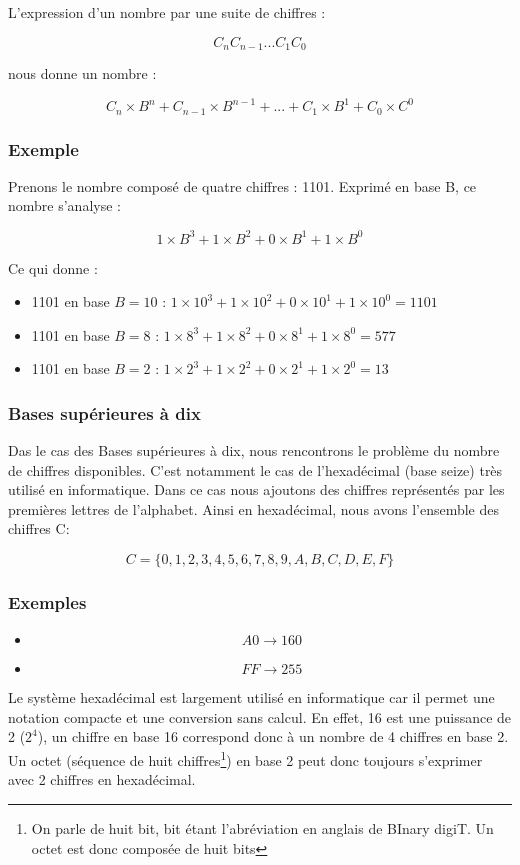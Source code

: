 \documentclass[a4paper,11pt]{book}
\theoremstyle{definition}
\begin{document}
L'expression d'un nombre par une suite de chiffres :

\[C_n C_{n-1} ... C_1 C_0\]

nous donne un nombre : 

\[C_n \times B^n + C_{n-1} \times B^{n-1} + ... + C_1 \times B^1 + C_0 \times C^0\]

\subsubsection{Exemple}

Prenons le nombre composé de quatre chiffres : 1101. Exprimé en base B, ce nombre s'analyse :

\[ 1\times B^{3}+1\times B^{2}+0\times B^{1}+1\times B^{0} \]

Ce qui donne :
\begin{itemize}
    \item 1101 en base $B = 10$ : $1\times 10^{3}+1\times 10^{2}+0\times 10^{1}+1\times 10^{0} = 1101 $
    \item 1101 en base $B = 8$ : $1\times 8^{3}+1\times 8^{2}+0\times 8^{1}+1\times 8^{0} = 577$
    \item 1101 en base $B = 2$ : $1\times 2^{3}+1\times 2^{2}+0\times 2^{1}+1\times 2^{0} = 13$
\end{itemize}

\subsubsection{Bases supérieures à dix}
Das le cas des Bases supérieures à dix, nous rencontrons le problème du nombre de chiffres disponibles. C'est notamment le cas de l'hexadécimal (base seize) très utilisé en informatique. Dans ce cas nous ajoutons des chiffres représentés par les premières lettres de l'alphabet.
Ainsi en hexadécimal, nous avons l'ensemble des chiffres C:

\[C = \{0,1,2,3,4,5,6,7,8,9,A,B,C,D,E,F\}\]

\subsubsection{Exemples}
\begin{itemize}
    \item \[A0 \rightarrow 160\]
    \item \[FF \rightarrow 255\]
\end{itemize}

Le système hexadécimal est largement utilisé en informatique car il permet une notation compacte et une conversion sans calcul. En effet, 16 est une puissance de 2 ($2^4$), un chiffre en base 16 correspond donc à un nombre de 4 chiffres en base 2. Un octet (séquence de huit chiffres\footnote{On parle de huit bit, bit étant l'abréviation en anglais de BInary digiT. Un octet est donc composée de huit bits}) en base 2 peut donc toujours s'exprimer avec 2 chiffres en hexadécimal.
\end{document}

